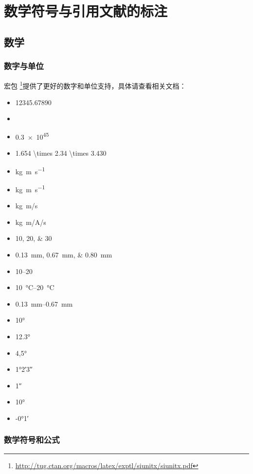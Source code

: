 \chapter{数学符号与引用文献的标注}

\section{数学}

\subsection{数字与单位}

宏包  \footnote{\url{http://tug.ctan.org/macros/latex/exptl/siunitx/siunitx.pdf}}提供了更好的数字和单位支持，具体请查看相关文档：
\begin{itemize}
	\item \num{12345,67890}
	\item {}
	\item \num{.3e45}
	\item \num[parse-numbers=false]{1.654 \times 2.34 \times 3.430}
	\item \si{kg.m.s^{-1}}
	\item \si{\kilogram\metre\per\second}
	\item \si[per-mode=symbol]{\kilogram\metre\per\second}
	\item \si[per-mode=symbol]{\kilogram\metre\per\ampere\per\second}
	\item \numlist{10;20;30}
	\item \SIlist{0.13;0.67;0.80}{\milli\metre}
	\item \numrange{10}{20}
    \item \SIrange{10}{20}{\degreeCelsius}
	\item \SIrange{0.13}{0.67}{\milli\metre}
	\item \ang{10}
	\item \ang{12.3}
	\item \ang{4,5}
	\item \ang{1;2;3}
	\item \ang{;;1}
	\item \ang{+10;;}
	\item \ang{-0;1;}
\end{itemize}

\subsection{数学符号和公式}

